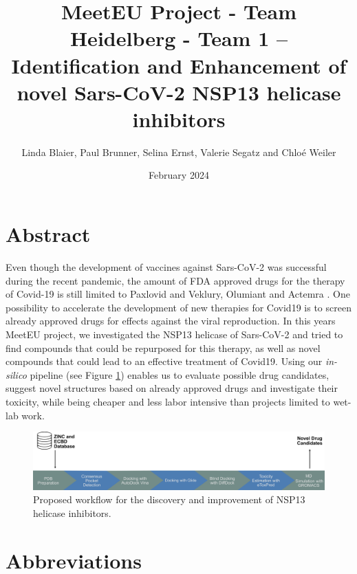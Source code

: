 \documentclass[11pt, letterpaper, titlepage]{article}
\title{MeetEU Project - Team Heidelberg - Team 1 -- \\ Identification and Enhancement of novel Sars-CoV-2 NSP13 helicase inhibitors}
\author{Linda Blaier, Paul Brunner, Selina Ernst, Valerie Segatz and Chlo\'{e} Weiler}
\date{February 2024}
\renewcommand{\cite}{\parencite}
\begin{document}
\maketitle

\ihead{\headmark}
\cfoot{\pagemark}   %

\section{Abstract}
Even though the development of vaccines against Sars-CoV-2 was successful during the recent pandemic, the amount of FDA approved drugs for the therapy of Covid-19 is still limited to Paxlovid and Veklury, Olumiant and Actemra \cite{FDACOVID}. One possibility to accelerate the development of new therapies for Covid19 is to screen already approved drugs for effects against the viral reproduction. In this years MeetEU project, we investigated the NSP13 helicase of Sars-CoV-2 and tried to find compounds that could be repurposed for this therapy, as well as novel compounds that could lead to an effective treatment of Covid19. Using our \textit{in-silico} pipeline (see Figure \ref{workflow}) enables us to evaluate possible drug candidates, suggest novel structures based on already approved drugs and investigate their toxicity, while being cheaper and less labor intensive than projects limited to wet-lab work. 

\begin{figure}[h]
  \centering
  \includegraphics[width=\textwidth]{Workflow_MeetEU.pdf}
  \caption{Proposed workflow for the discovery and improvement of NSP13 helicase inhibitors.}
  \label{workflow}
\end{figure}
\newpage
\FloatBarrier
{\setlength{\parskip}{0.2cm}
\section*{Abbreviations}
    \begin{acronym}[LC-MS/MS23]
        
        
        
        
    \end{acronym}
}
\newpage
\end{document}
